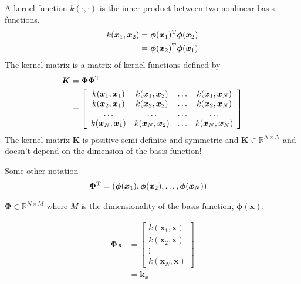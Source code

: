 \documentclass[11pt]{article}
\newcommand{\vct}[1]{\boldsymbol{#1}} %
\newcommand{\mat}[1]{\boldsymbol{#1}} %
\newcommand{\T}{^{\textrm T}} %
\newcommand{\ProbOpr}[1]{\mathbb{#1}}
\begin{document}
A kernel function $k(\cdot, \cdot)$ is the inner product between two nonlinear basis functions. 
\begin{align*}
k(\vct{x}_1, \vct{x}_2) &= \vct{\phi}(\vct{x}_1)\T \vct{\phi}(\vct{x}_2) \\
&= \vct{\phi}(\vct{x}_2)\T \vct{\phi}(\vct{x}_1) 
\end{align*}
The kernel matrix is a matrix of kernel functions defined by
\begin{align*}
\mat{K} &= \mat{\Phi}\mat{\Phi}\T\\
&= \left[ \begin{array}{c c c c} k(\vct{x}_1, \vct{x}_1) & k(\vct{x}_1, \vct{x}_2) & \hdots & k(\vct{x}_1, \vct{x}_N) \\ k(\vct{x}_2, \vct{x}_1) & k(\vct{x}_2, \vct{x}_2) & \hdots & k(\vct{x}_2, \vct{x}_N) \\ \hdots & \hdots & \hdots & \hdots \\ k(\vct{x}_N, \vct{x}_1) & k(\vct{x}_N, \vct{x}_2) & \hdots & k(\vct{x}_N, \vct{x}_N) \end{array} \right]
\end{align*}
The kernel matrix $\mat{K}$ is positive semi-definite and symmetric and $\mat{K} \in \ProbOpr{R}^{N \times N}$ and doesn't depend on the dimension of the basis function! 

Some other notation
\begin{align*}
\vct{\Phi}\T &= (\vct{\phi}(\vct{x}_1), \vct{\phi}(\vct{x}_2), \hdots ,\vct{\phi}(\vct{x}_N))
\end{align*}

$\vct{\Phi} \in \ProbOpr{R}^{N \times M}$ where $M$ is the dimensionality of the basis function, $\vct{\phi}(\vct{x})$.

\begin{align*}
\vct{\Phi}\vct{x} &= \left[ \begin{array}{c} k(\vct{x}_1, \vct{x}) \\ k(\vct{x}_2, \vct{x}) \\ \vdots \\ k(\vct{x}_N, \vct{x}) \end{array} \right]\\
&= \vct{k}_x
\end{align*}
\end{document}
